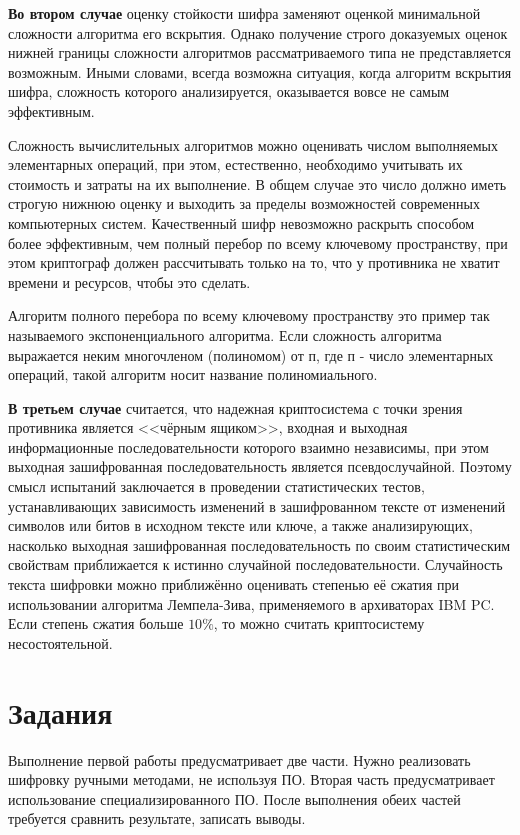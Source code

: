 \noindent \textbf{Во втором случае} оценку стойкости шифра заменяют оценкой
минимальной сложности алгоритма его вскрытия. Однако получение строго
доказуемых оценок нижней границы сложности алгоритмов рассматриваемого типа
не представляется возможным. Иными словами, всегда возможна ситуация, когда
алгоритм вскрытия шифра, сложность которого анализируется, оказывается вовсе
не самым эффективным.

Сложность вычислительных алгоритмов можно оценивать числом выполняемых
элементарных операций, при этом, естественно, необходимо учитывать их
стоимость и затраты на их выполнение. В общем случае это число должно иметь
строгую нижнюю оценку и выходить за пределы возможностей современных
компьютерных систем. Качественный шифр невозможно раскрыть способом более
эффективным, чем полный перебор по всему ключевому пространству, при этом
криптограф должен рассчитывать только на то, что у противника не хватит
времени и ресурсов, чтобы это сделать.

Алгоритм полного перебора по всему ключевому пространству это пример так
называемого экспоненциального алгоритма. Если сложность алгоритма выражается
неким многочленом (полиномом) от п, где п - число элементарных операций,
такой алгоритм носит название полиномиального.

\noindent \textbf{В третьем случае} считается, что надежная криптосистема с
точки зрения противника
 является <<чёрным ящиком>>, входная и выходная информационные последовательности
которого взаимно независимы, при этом выходная зашифрованная последовательность
является псевдослучайной. Поэтому смысл испытаний заключается в проведении статистических
 тестов, устанавливающих зависимость изменений в зашифрованном тексте от изменений
 символов или битов в исходном тексте или ключе, а также анализирующих, насколько
 выходная зашифрованная последовательность по своим статистическим свойствам
приближается к истинно случайной последовательности. Случайность текста шифровки
 можно приближённо оценивать степенью её сжатия при использовании алгоритма Лемпела-Зива,
 применяемого в архиваторах IBM PC. Если степень сжатия больше $10\%$, то можно
 считать криптосистему несостоятельной.

\section{Задания}\label{sect1_b}
Выполнение первой работы предусматривает две части. Нужно реализовать
шифровку ручными методами, не используя ПО. Вторая часть предусматривает
использование специализированного ПО. После выполнения обеих частей требуется
сравнить результате, записать выводы.

